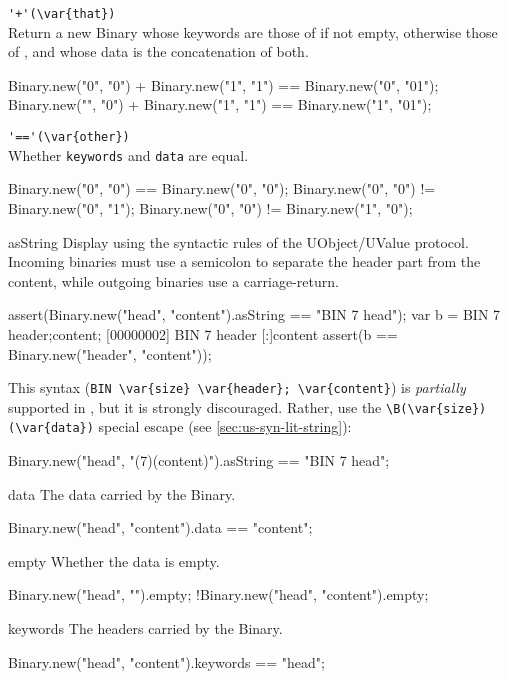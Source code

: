 \begin{urbiscriptapi}
\item \lstinline|'+'(\var{that})|\\
  Return a new Binary whose keywords are those of \this if
  not empty, otherwise those of , and whose data is the
  concatenation of both.
\begin{urbiassert}
Binary.new("0", "0") + Binary.new("1", "1")
       == Binary.new("0", "01");
Binary.new("", "0") + Binary.new("1", "1")
       == Binary.new("1", "01");
\end{urbiassert}

\item \lstinline|'=='(\var{other})|\\
  Whether \lstinline|keywords| and \lstinline|data| are equal.
\begin{urbiassert}
Binary.new("0", "0") == Binary.new("0", "0");
Binary.new("0", "0") != Binary.new("0", "1");
Binary.new("0", "0") != Binary.new("1", "0");
\end{urbiassert}

\item[asString]
  Display using the syntactic rules of the UObject/UValue protocol.
  Incoming binaries must use a semicolon to separate the header part
  from the content, while outgoing binaries use a carriage-return.
\begin{urbiscript}
assert(Binary.new("head", "content").asString
       == "BIN 7 head\ncontent");
var b = BIN 7 header;content;
[00000002] BIN 7 header
[:]content
assert(b == Binary.new("header", "content"));
\end{urbiscript}

This syntax (\lstinline|BIN \var{size} \var{header}; \var{content}|)
is \emph{partially} supported in \us, but it is strongly discouraged.
Rather, use the \lstinline|\B(\var{size})(\var{data})| special escape
(see \autoref{sec:us-syn-lit-string}):

\begin{urbiassert}
Binary.new("head", "\B(7)(content)").asString
       == "BIN 7 head\ncontent";
\end{urbiassert}


\item[data]
  The data carried by the Binary.
\begin{urbiassert}
Binary.new("head", "content").data == "content";
\end{urbiassert}

\item[empty]
  Whether the data is empty.
\begin{urbiassert}
Binary.new("head", "").empty;
!Binary.new("head", "content").empty;
\end{urbiassert}

\item[keywords]
  The headers carried by the Binary.
\begin{urbiassert}
Binary.new("head", "content").keywords == "head";
\end{urbiassert}
\end{urbiscriptapi}


